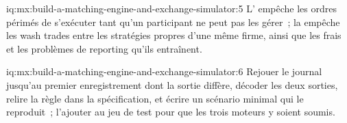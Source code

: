 \begin{solution}{iq:mx:build-a-matching-engine-and-exchange-simulator:5}
L' empêche les ordres périmés de s'exécuter tant qu'un participant ne peut pas les gérer~; la  empêche les wash trades entre les stratégies
propres d'une même firme, ainsi que les frais et les problèmes de reporting qu'ils entraînent.
\end{solution}

\begin{solution}{iq:mx:build-a-matching-engine-and-exchange-simulator:6}
Rejouer le journal jusqu'au premier enregistrement dont la sortie diffère, décoder les deux sorties, relire la règle dans la spécification, et écrire un scénario minimal qui
le reproduit~; l'ajouter au jeu de test pour que les trois moteurs y soient soumis.
\end{solution}
